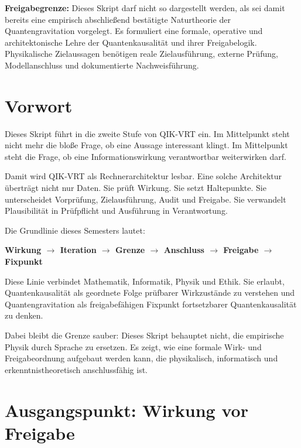 \documentclass[11pt,a4paper,oneside]{book}
\begin{document}
\begin{warnbox}
\textbf{Freigabegrenze:} Dieses Skript darf nicht so dargestellt werden, als sei damit bereits eine empirisch abschließend bestätigte Naturtheorie der Quantengravitation vorgelegt. Es formuliert eine formale, operative und architektonische Lehre der Quantenkausalität und ihrer Freigabelogik. Physikalische Zielaussagen benötigen reale Zielausführung, externe Prüfung, Modellanschluss und dokumentierte Nachweisführung.
\end{warnbox}

\chapter*{Vorwort}

Dieses Skript führt in die zweite Stufe von QIK-VRT ein. Im Mittelpunkt steht nicht mehr die bloße Frage, ob eine Aussage interessant klingt. Im Mittelpunkt steht die Frage, ob eine Informationswirkung verantwortbar weiterwirken darf.

Damit wird QIK-VRT als Rechnerarchitektur lesbar. Eine solche Architektur überträgt nicht nur Daten. Sie prüft Wirkung. Sie setzt Haltepunkte. Sie unterscheidet Vorprüfung, Zielausführung, Audit und Freigabe. Sie verwandelt Plausibilität in Prüfpflicht und Ausführung in Verantwortung.

Die Grundlinie dieses Semesters lautet:

\begin{merkbox}
\centering
\textbf{Wirkung $\rightarrow$ Iteration $\rightarrow$ Grenze $\rightarrow$ Anschluss $\rightarrow$ Freigabe $\rightarrow$ Fixpunkt}
\end{merkbox}

Diese Linie verbindet Mathematik, Informatik, Physik und Ethik. Sie erlaubt, Quantenkausalität als geordnete Folge prüfbarer Wirkzustände zu verstehen und Quantengravitation als freigabefähigen Fixpunkt fortsetzbarer Quantenkausalität zu denken.

Dabei bleibt die Grenze sauber: Dieses Skript behauptet nicht, die empirische Physik durch Sprache zu ersetzen. Es zeigt, wie eine formale Wirk- und Freigabeordnung aufgebaut werden kann, die physikalisch, informatisch und erkenntnistheoretisch anschlussfähig ist.

\tableofcontents
\mainmatter

\chapter{Ausgangspunkt: Wirkung vor Freigabe}
\end{document}
